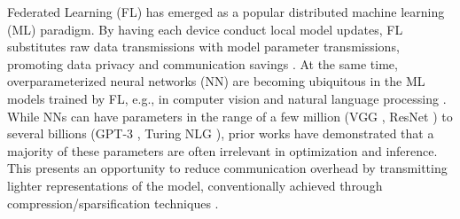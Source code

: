 \documentclass{article}
\begin{document}
Federated Learning (FL) \citep{konevcny2016federated} has emerged as a popular  distributed machine learning (ML) paradigm. By having each device conduct local model updates, FL substitutes raw data transmissions with model parameter transmissions,
promoting data privacy \citep{shokri2015privacy, azam2020towards} and  communication savings \citep{wang2020tackling}.
At the same time, overparameterized neural networks (NN) are becoming ubiquitous in the ML models trained by FL, e.g., in computer vision \citep{
liu2016ssd, huang2017densely} and natural language processing \citep{brown2020language, 
liu2019roberta}. While NNs can have parameters in the range of a few million (VGG \citep{simonyan2014very}, ResNet \citep{he2016deep}) to several billions (GPT-3 \citep{brown2020language}, Turing NLG \citep{turing2020nlg}), prior works have demonstrated that a majority of these parameters are often irrelevant \citep{frankle2018lottery, liu2018rethinking, han2015learning, li2016pruning} in optimization and inference. This presents an opportunity to reduce communication overhead by transmitting lighter representations of the model, conventionally achieved through compression/sparsification techniques \citep{wang2018atomo, alistarh2016qsgd, vogels2019powersgd}. 
\end{document}
